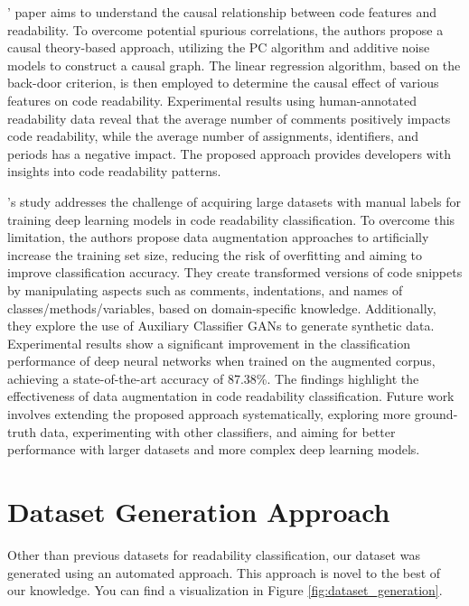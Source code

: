 \documentclass[%
class=scrreprt,
chapterprefix=false,%
open=right,%
twoside=false,%
paper=a4,%
logofile={Logo\_zentral\_farbig\_EN.png},%
thesistype=master,%
UKenglish,%
]{se2thesis}
\begin{document}
	\citeauthor{mi2023makes}' paper aims to understand the causal relationship between code features and readability. To overcome potential spurious correlations, the authors propose a causal theory-based approach, utilizing the PC algorithm and additive noise models to construct a causal graph. The linear regression algorithm, based on the back-door criterion, is then employed to determine the causal effect of various features on code readability. Experimental results using human-annotated readability data reveal that the average number of comments positively impacts code readability, while the average number of assignments, identifiers, and periods has a negative impact. The proposed approach provides developers with insights into code readability patterns.
	
	\citeauthor{oliveira2020evaluating}'s study addresses the challenge of acquiring large datasets with manual labels for training deep learning models in code readability classification. To overcome this limitation, the authors propose data augmentation approaches to artificially increase the training set size, reducing the risk of overfitting and aiming to improve classification accuracy. They create transformed versions of code snippets by manipulating aspects such as comments, indentations, and names of classes/methods/variables, based on domain-specific knowledge. Additionally, they explore the use of Auxiliary Classifier GANs to generate synthetic data. Experimental results show a significant improvement in the classification performance of deep neural networks when trained on the augmented corpus, achieving a state-of-the-art accuracy of 87.38\%. The findings highlight the effectiveness of data augmentation in code readability classification. Future work involves extending the proposed approach systematically, exploring more ground-truth data, experimenting with other classifiers, and aiming for better performance with larger datasets and more complex deep learning models.
		
	
	\section{Dataset Generation Approach} \label{Dataset Generation Approach}
	Other than previous datasets for readability classification, our dataset was generated using an automated approach. This approach is novel to the best of our knowledge. You can find a visualization in Figure \ref{fig:dataset_generation}.
	
\end{document}
